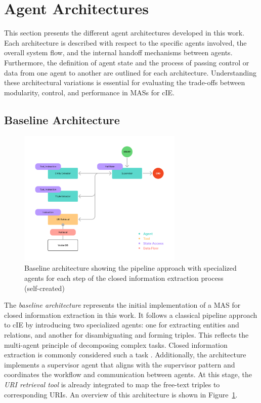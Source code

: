 \documentclass[a4paper,oneside,bibliography=totoc]{scrbook}
\begin{document}
\section{Agent Architectures}
\label{sec:agent_architectures}

This section presents the different agent architectures developed in this work. Each architecture is described with respect to the specific agents involved, the overall system flow, and the internal handoff mechanisms between agents. Furthermore, the definition of agent state and the process of passing control or data from one agent to another are outlined for each architecture. Understanding these architectural variations is essential for evaluating the trade-offs between modularity, control, and performance in \acp{MAS} for \ac{cIE}.

\subsection{Baseline Architecture}
\label{subsec:baseline}

\begin{figure}[tp]
  \centering
  \includegraphics[width=0.7\textwidth]{figures/Baseline Architecture.png}
  \caption[Baseline architecture showing the pipeline approach with specialized agents for each step of the closed information extraction process]{Baseline architecture showing the pipeline approach with specialized agents for each step of the closed information extraction process (self-created)}
  \label{fig:baseline_architecture}
\end{figure}

The \textit{baseline architecture} represents the initial implementation of a \ac{MAS} for closed information extraction in this work. It follows a classical pipeline approach to \ac{cIE} by introducing two specialized agents: one for extracting entities and relations, and another for disambiguating and forming triples. This reflects the multi-agent principle of decomposing complex tasks. Closed information extraction is commonly considered such a task \cite{Josifoski2021}. Additionally, the architecture implements a supervisor agent that aligns with the supervisor pattern and coordinates the workflow and communication between agents. At this stage, the \textit{URI retrieval tool} is already integrated to map the free-text triples to corresponding URIs. An overview of this architecture is shown in Figure~\ref{fig:baseline_architecture}.
\end{document}
